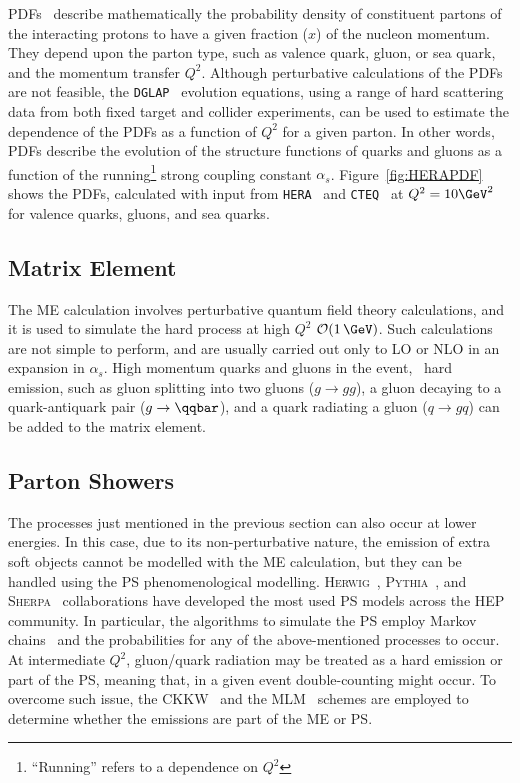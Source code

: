 			\acp{PDF}~\cite{Campbell2007} describe mathematically the probability density of constituent partons of the interacting protons to have a given fraction ($x$) of the nucleon momentum. They depend upon the parton type, such as valence quark, gluon, or sea quark, and the momentum transfer $Q^2$. Although perturbative calculations of the \acp{PDF} are not feasible, the \texttt{DGLAP}~\cite{Gribov:1972ri, Altarelli:1977zs} evolution equations, using a range of hard scattering data from both fixed target and collider experiments, can be used to estimate the dependence of the \acp{PDF} as a function of $Q^2$ for a given parton. In other words, \acp{PDF} describe the evolution of the structure functions of quarks and gluons as a function of the running\footnote{``Running'' refers to a dependence on $Q^2$} strong coupling constant $\alpha_s$. Figure~\ref{fig:HERAPDF} shows the \acp{PDF}, calculated with input from \texttt{HERA}~\cite{Aaron:2009aa} and \texttt{CTEQ}~\cite{Botts:1992yi} at $Q^2 = 10 \GeV^2$ for valence quarks, gluons, and sea quarks.



		\subsection*{Matrix Element}

			The \ac{ME} calculation involves perturbative quantum field theory calculations, and it is used to simulate the hard process at high $Q^2$ $\mathcal{O}(1\, \GeV)$. 
			Such calculations are not simple to perform, and are usually carried out only to \ac{LO} or \ac{NLO} in an expansion in $\alpha_s$. High momentum quarks and gluons in the event, \ie\ hard emission, such as gluon splitting into two gluons ($g\to gg$), a gluon decaying to a quark-antiquark pair ($g \to \qqbar$), and a quark radiating a gluon ($q \to gq$) can be added to the matrix element.

		\subsection*{Parton Showers}

			The processes just mentioned in the previous section can also occur at lower energies. In this case, due to its non-perturbative nature, the emission of extra soft objects cannot be modelled with the \ac{ME} calculation, but they can be handled using the \ac{PS} phenomenological modelling. \textsc{Herwig}~\cite{Herwig2001}, \textsc{Pythia}~\cite{Pythia2006}, and \textsc{Sherpa}~\cite{Sherpa} collaborations have developed the most used \ac{PS} models across the \ac{HEP} community. In particular, the algorithms to simulate the \ac{PS} employ Markov chains~\cite{Berg2004} and the probabilities for any of the above-mentioned processes to occur. At intermediate $Q^2$, gluon/quark radiation may be treated as a hard emission or part of the \ac{PS}, meaning that, in a given event double-counting might occur. To overcome such issue, the \ac{CKKW}~\cite{QCD2001} and the \ac{MLM}~\cite{ME2001} schemes are employed to determine whether the emissions are part of the \ac{ME} or \ac{PS}. 


